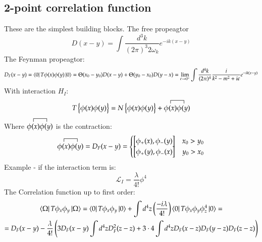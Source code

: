 \documentclass{article}
\begin{document}
\subsection{2-point correlation function}
These are the simplest building blocks.
The free propeagtor
\begin{equation*}
    D(x - y) = \int \frac{d^3k}{(2\pi)^3 2\omega_k}e^{-ik(x - y)}
\end{equation*}
The Feynman propeagtor:
\begin{equation*}
    D_F(x - y) = \bra{0}T\phi(x)\phi(y)\ket{0} = 
    \Theta(x_0 - y_0)D(x - y) + \Theta(y_0 - x_0)D(y - x) =
    \lim_{\epsilon \rightarrow 0^{+}} \int \frac{d^4k}{(2\pi)^4}\frac{i}{k^2 - m^2 + i\epsilon}e^{-ik(x - y)}
\end{equation*}
With interaction $H_I$:
\begin{equation*}
    T\left\{\phi(x)\phi(y)\right\} = N\left\{\phi(x)\phi(y)\right\} + \contraction{}{\phi(x)}{}{\phi(y)}\phi(x)\phi(y)
\end{equation*}
Where $\contraction{}{\phi(x)}{}{\phi(y)}\phi(x)\phi(y)$ is the contraction:
\begin{equation*}
    \contraction{}{\phi(x)}{}{\phi(y)}\phi(x)\phi(y) = D_F(x - y) = \begin{cases}
        \left[\phi_{+}(x), \phi_{-}(y)\right] & x_0 > y_0
        \\
        \left[\phi_{+}(y), \phi_{-}(x)\right] & y_0 > x_0
    \end{cases}
\end{equation*}
Example - if the interaction term is:
\begin{equation*}
    \mathcal{L}_I = \frac{\lambda}{4!}\phi^4
\end{equation*}
The Correlation function up to first order:
\begin{equation*}
\begin{gathered}
    \bra{\Omega}T\phi_x\phi_y\ket{\Omega} =
    \bra{0}T\phi_x\phi_y\ket{0} + \int d^4z \left(\frac{-i\lambda}{4!}\right)\bra{0}T\phi_x\phi_y\phi_z^4\ket{0} = \\ =
    D_F(x - y) - \frac{\lambda}{4!} \left(
        3D_F(x-y)\int d^4z D_F^2(z-z) +
        3\cdot4\int d^4z D_F(x - z)D_F(y - z)D_F(z-z)
    \right)
\end{gathered}
\end{equation*}
\end{document}
